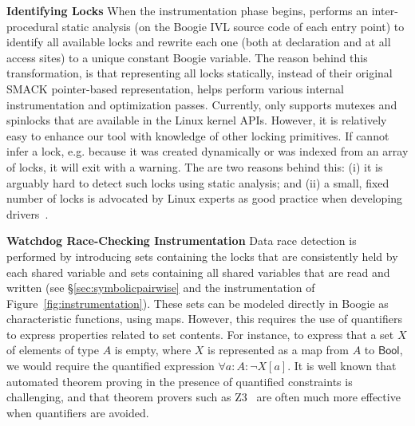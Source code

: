 \medskip\noindent\textbf{Identifying Locks }
%
When the instrumentation phase begins, \whoop performs an inter-procedural static analysis (on the Boogie IVL source code of each entry point) to identify all available locks and rewrite each one (both at declaration and at all access sites) to a unique constant Boogie variable. The reason behind this transformation, is that representing all locks statically, instead of their original SMACK pointer-based representation, helps \whoop perform various internal instrumentation and optimization passes.
%
Currently, \whoop only supports mutexes and spinlocks that are available in the Linux kernel APIs. However, it is relatively easy to enhance our tool with knowledge of other locking primitives. If \whoop cannot infer a lock, e.g. because it was created dynamically or was indexed from an array of locks, it will exit with a warning. The are two reasons behind this: (i) it is arguably hard to detect such locks using static analysis; and (ii) a small, fixed number of locks is advocated by Linux experts as good practice when developing drivers~\cite{corbet2005linux}.

\medskip\noindent\textbf{Watchdog Race-Checking Instrumentation }
%
Data race detection is performed by introducing sets containing the locks that are consistently held by each shared variable and sets containing all shared variables that are read and written (see \S\ref{sec:symbolicpairwise} and the instrumentation of Figure~\ref{fig:instrumentation}). These sets can be modeled directly in Boogie as characteristic functions, using maps. However, this requires the use of quantifiers to express properties related to set contents.  For instance, to express that a set $X$ of elements of type $A$ is empty, where $X$ is represented as a map from $A$ to $\mathsf{Bool}$, we would require the quantified expression $\forall a : A : \neg X[a]$.  It is well known that automated theorem proving in the presence of quantified constraints is challenging, and that theorem provers such as Z3~\cite{de2008z3} are often much more effective when quantifiers are avoided.  

